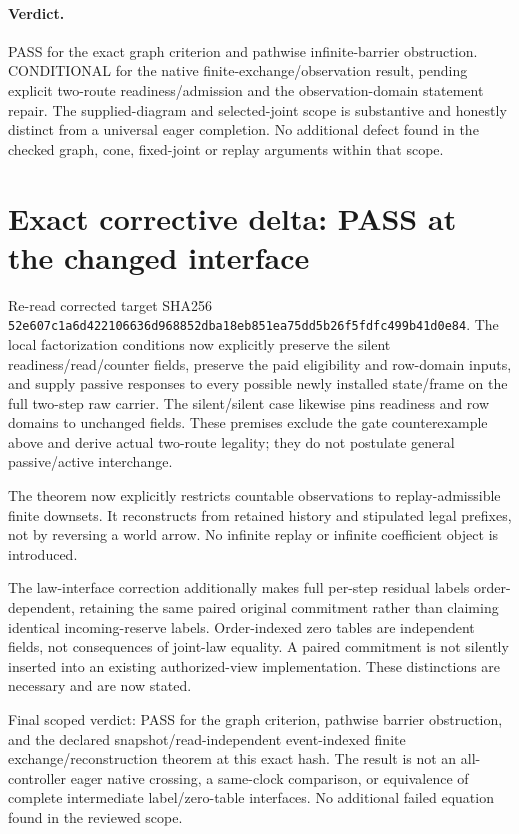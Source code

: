 \documentclass{article}
\begin{document}
\paragraph{Verdict.}
PASS for the exact graph criterion and pathwise infinite-barrier obstruction. CONDITIONAL for the native finite-exchange/observation result, pending explicit two-route readiness/admission and the observation-domain statement repair. The supplied-diagram and selected-joint scope is substantive and honestly distinct from a universal eager completion. No additional defect found in the checked graph, cone, fixed-joint or replay arguments within that scope.
\section*{Exact corrective delta: PASS at the changed interface}
Re-read corrected target SHA256
\texttt{52e607c1a6d422106636d968852dba18eb851ea75dd5b26f5fdfc499b41d0e84}.
The local factorization conditions now explicitly preserve the silent readiness/read/counter fields, preserve the paid eligibility and row-domain inputs, and supply passive responses to every possible newly installed state/frame on the full two-step raw carrier. The silent/silent case likewise pins readiness and row domains to unchanged fields. These premises exclude the gate counterexample above and derive actual two-route legality; they do not postulate general passive/active interchange.

The theorem now explicitly restricts countable observations to replay-admissible finite downsets. It reconstructs from retained history and stipulated legal prefixes, not by reversing a world arrow. No infinite replay or infinite coefficient object is introduced.

The law-interface correction additionally makes full per-step residual labels order-dependent, retaining the same paired original commitment rather than claiming identical incoming-reserve labels. Order-indexed zero tables are independent fields, not consequences of joint-law equality. A paired commitment is not silently inserted into an existing authorized-view implementation. These distinctions are necessary and are now stated.

Final scoped verdict: PASS for the graph criterion, pathwise barrier obstruction, and the declared snapshot/read-independent event-indexed finite exchange/reconstruction theorem at this exact hash. The result is not an all-controller eager native crossing, a same-clock comparison, or equivalence of complete intermediate label/zero-table interfaces. No additional failed equation found in the reviewed scope.
\end{document}
